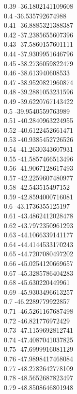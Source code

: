 {0.39	-36.1802141109608\\
0.4	-36.535792674988\\
0.41	-36.8885321388387\\
0.42	-37.2385655607396\\
0.43	-37.5860157601111\\
0.44	-37.9309951646796\\
0.45	-38.2736059822479\\
0.46	-38.613940608533\\
0.47	-38.9520821960874\\
0.48	-39.2881053231596\\
0.49	-39.6220767143422\\
0.5	-39.9540559763989\\
0.51	-40.2840963224955\\
0.52	-40.6122452661471\\
0.53	-40.9385452726526\\
0.54	-41.2630343607931\\
0.55	-41.5857466513496\\
0.56	-41.9067128617493\\
0.57	-42.2259607480977\\
0.58	-42.543515497152\\
0.59	-42.8594000716081\\
0.6	-43.1736355125197\\
0.61	-43.4862412028478\\
0.62	-43.7972350961293\\
0.63	-44.1066339141177\\
0.64	-44.4144533170243\\
0.65	-44.7207080497202\\
0.66	-45.0254120669657\\
0.67	-45.3285786404283\\
0.68	-45.630220449961\\
0.69	-45.9303496613257\\
0.7	-46.2289779922857\\
0.71	-46.5261167687498\\
0.72	-46.821776972429\\
0.73	-47.1159692812741\\
0.74	-47.4087041037825\\
0.75	-47.6999916081129\\
0.76	-47.9898417468084\\
0.77	-48.2782642778109\\
0.78	-48.5652687823497\\
0.79	-48.8508646801948\\
}

